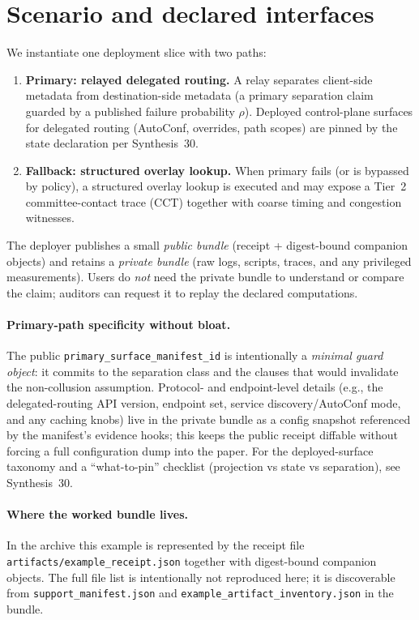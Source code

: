 \documentclass[11pt]{article}
\begin{document}
\section{Scenario and declared interfaces}
\label{sec:scenario}
We instantiate one deployment slice with two paths:
\begin{enumerate}[leftmargin=*]
\item \textbf{Primary: relayed delegated routing.} A relay separates client-side metadata from destination-side metadata (a primary separation claim guarded by a published failure probability $\rho$). Deployed control-plane surfaces for delegated routing (AutoConf, overrides, path scopes) are pinned by the state declaration per Synthesis~30.\cite{series:primarysepmanifest,series:deployedsurfaces}
\item \textbf{Fallback: structured overlay lookup.} When primary fails (or is bypassed by policy), a structured overlay lookup is executed and may expose a Tier~2 committee-contact trace (CCT) together with coarse timing and congestion witnesses.\cite{series:traceifaces,series:tieredobs}
\end{enumerate}
The deployer publishes a small \emph{public bundle} (receipt + digest-bound companion objects) and retains a \emph{private bundle} (raw logs, scripts, traces, and any privileged measurements).
Users do \emph{not} need the private bundle to understand or compare the claim; auditors can request it to replay the declared computations.\cite{series:auditorreplay}

\paragraph{Primary-path specificity without bloat.}
The public \texttt{primary\_surface\_manifest\_id} is intentionally a \emph{minimal guard object}: it commits to the separation class and the clauses that would invalidate the non-collusion assumption.\cite{series:primarysepmanifest}
Protocol- and endpoint-level details (e.g., the delegated-routing API version, endpoint set, service discovery/AutoConf mode, and any caching knobs) live in the private bundle as a config snapshot referenced by the manifest's evidence hooks; this keeps the public receipt diffable without forcing a full configuration dump into the paper.
For the deployed-surface taxonomy and a ``what-to-pin'' checklist (projection vs state vs separation), see Synthesis~30.\cite{series:deployedsurfaces}

\paragraph{Where the worked bundle lives.}
In the archive this example is represented by the receipt file \texttt{artifacts/example\_receipt.json} together with digest-bound companion objects.
The full file list is intentionally not reproduced here; it is discoverable from \texttt{support\_manifest.json} and \texttt{example\_artifact\_inventory.json} in the bundle.
\end{document}
